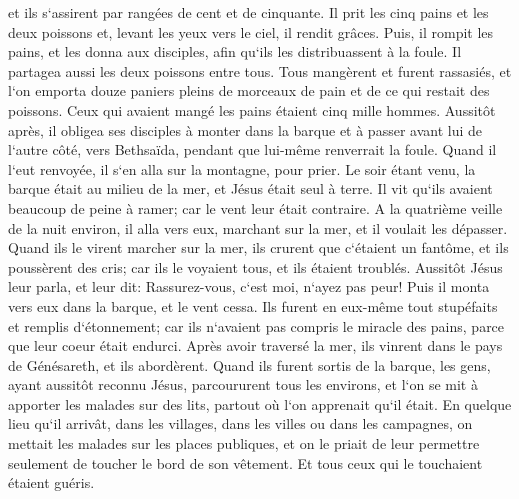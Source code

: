 \verse et ils s`assirent par rangées de cent et de cinquante. 
\verse Il prit les cinq pains et les deux poissons et, levant les yeux vers le ciel, il rendit grâces. Puis, il rompit les pains, et les donna aux disciples, afin qu`ils les distribuassent à la foule. Il partagea aussi les deux poissons entre tous. 
\verse Tous mangèrent et furent rassasiés, 
\verse et l`on emporta douze paniers pleins de morceaux de pain et de ce qui restait des poissons. 
\verse Ceux qui avaient mangé les pains étaient cinq mille hommes. 
\verse Aussitôt après, il obligea ses disciples à monter dans la barque et à passer avant lui de l`autre côté, vers Bethsaïda, pendant que lui-même renverrait la foule. 
\verse Quand il l`eut renvoyée, il s`en alla sur la montagne, pour prier. 
\verse Le soir étant venu, la barque était au milieu de la mer, et Jésus était seul à terre. 
\verse Il vit qu`ils avaient beaucoup de peine à ramer; car le vent leur était contraire. A la quatrième veille de la nuit environ, il alla vers eux, marchant sur la mer, et il voulait les dépasser. 
\verse Quand ils le virent marcher sur la mer, ils crurent que c`étaient un fantôme, et ils poussèrent des cris; 
\verse car ils le voyaient tous, et ils étaient troublés. Aussitôt Jésus leur parla, et leur dit: Rassurez-vous, c`est moi, n`ayez pas peur! 
\verse Puis il monta vers eux dans la barque, et le vent cessa. Ils furent en eux-même tout stupéfaits et remplis d`étonnement; 
\verse car ils n`avaient pas compris le miracle des pains, parce que leur coeur était endurci. 
\verse Après avoir traversé la mer, ils vinrent dans le pays de Génésareth, et ils abordèrent. 
\verse Quand ils furent sortis de la barque, les gens, ayant aussitôt reconnu Jésus, 
\verse parcoururent tous les environs, et l`on se mit à apporter les malades sur des lits, partout où l`on apprenait qu`il était. 
\verse En quelque lieu qu`il arrivât, dans les villages, dans les villes ou dans les campagnes, on mettait les malades sur les places publiques, et on le priait de leur permettre seulement de toucher le bord de son vêtement. Et tous ceux qui le touchaient étaient guéris. 

